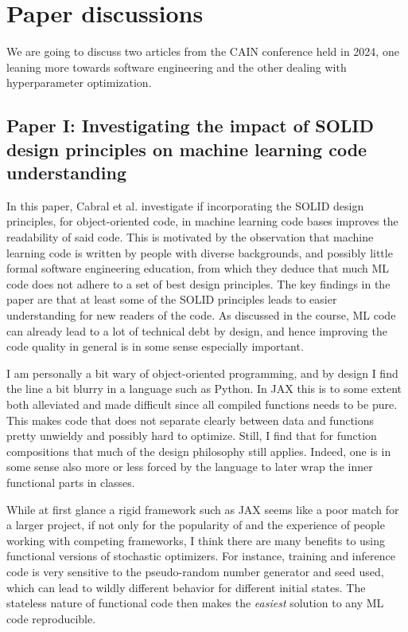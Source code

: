 \documentclass[11pt]{diazessay}
\begin{document}
\section*{Paper discussions}

We are going to discuss two articles from the CAIN conference held in 2024, one leaning more towards software engineering and the other dealing with hyperparameter optimization.

\subsection*{Paper I: Investigating the impact of SOLID design principles on machine learning code understanding\cite{cabral2024investigating}}

In this paper, Cabral et al. investigate if incorporating the SOLID design principles, for object-oriented code, in machine learning code bases improves the readability of said code. This is motivated by the observation that machine learning code is written by people with diverse backgrounds, and possibly little formal software engineering education, from which they deduce that much ML code does not adhere to a set of best design principles. The key findings in the paper are that at least some of the SOLID principles leads to easier understanding for new readers of the code. As discussed in the course, ML code can already lead to a lot of technical debt by design, and hence improving the code quality in general is in some sense especially important.

I am personally a bit wary of object-oriented programming, and by design I find the line a bit blurry in a language such as Python. In JAX this is to some extent both alleviated and made difficult since all compiled functions needs to be pure. This makes code that does not separate clearly between data and functions pretty unwieldy and possibly hard to optimize. Still, I find that for function compositions that much of the design philosophy still applies. Indeed, one is in some sense also more or less forced by the language to later wrap the inner functional parts in classes.

While at first glance a rigid framework such as JAX seems like a poor match for a larger project, if not only for the popularity of and the experience of people working with competing frameworks, I think there are many benefits to using functional versions of stochastic optimizers. For instance, training and inference code is very sensitive to the pseudo-random number generator and seed used, which can lead to wildly different behavior for different initial states. The stateless nature of functional code then makes the \textit{easiest} solution to any ML code reproducible.
\end{document}
